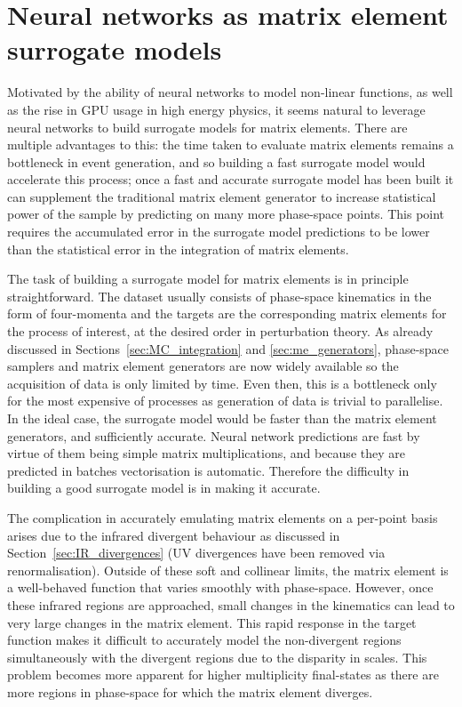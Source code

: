 \documentclass[main.tex]{subfiles}
\begin{document}
\section{Neural networks as matrix element surrogate models}\label{sec:NN_ME}
    Motivated by the ability of neural networks to
    model non-linear functions, as well as the rise
    in GPU usage in high energy physics, it seems
    natural to leverage neural networks to build surrogate
    models for matrix elements. There are multiple advantages
    to this: the time taken to evaluate matrix elements remains
    a bottleneck in event generation, and so building a
    fast surrogate model would accelerate this process;
    once a fast and accurate surrogate model has been
    built it can supplement the traditional matrix
    element generator to increase statistical power of the sample
    by predicting on many more phase-space points. This point
    requires the accumulated error in the surrogate model
    predictions to be lower than the statistical error in the
    integration of matrix elements.

    The task of building a surrogate
    model for matrix elements is in principle straightforward.
    The dataset usually consists of phase-space kinematics
    in the form of four-momenta and the targets are the
    corresponding matrix elements for the process of interest,
    at the desired order in perturbation theory. As already
    discussed in Sections~\ref{sec:MC_integration} and \ref{sec:me_generators},
    phase-space samplers and matrix element generators are
    now widely available so the acquisition of data is only
    limited by time. Even then, this is a bottleneck only
    for the most expensive of processes as generation
    of data is trivial to parallelise. In the ideal case, the
    surrogate model would be faster than the matrix
    element generators, and sufficiently accurate. Neural
    network predictions are fast by virtue of them being
    simple matrix multiplications, and because they are predicted
    in batches vectorisation is automatic. Therefore the difficulty
    in building a good surrogate model is in making it accurate.

    The complication in accurately emulating matrix elements
    on a per-point basis arises due to the infrared divergent behaviour
    as discussed in Section~\ref{sec:IR_divergences}
    (UV divergences have been removed via renormalisation).
    Outside of these soft and collinear limits, the matrix element
    is a well-behaved function that varies smoothly with phase-space.
    However, once these infrared regions are approached, small changes in the
    kinematics can lead to very large changes in the matrix
    element. This rapid response in the target
    function makes it difficult to accurately model the
    non-divergent regions simultaneously with the divergent
    regions due to the disparity in scales. This problem
    becomes more apparent for higher multiplicity final-states
    as there are more regions in phase-space for which
    the matrix element diverges.
\end{document}
